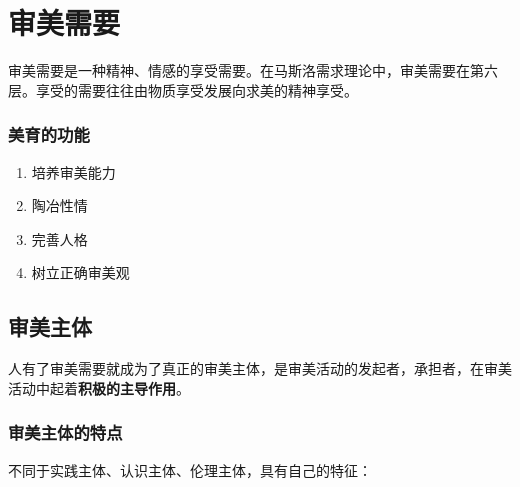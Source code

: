 \documentclass{NoteThesis/note-thesis}
\begin{document}
\maketitle

\tableofcontents

\newpage


\section{审美需要}

审美需要是一种精神、情感的享受需要。在马斯洛需求理论中，审美需要在第六层。享受的需要往往由物质享受发展向求美的精神享受。

\subsubsection*{美育的功能}

\begin{enumerate}
    \item 培养审美能力
    \item 陶冶性情
    \item 完善人格
    \item 树立正确审美观
\end{enumerate}

\subsection{审美主体}

人有了审美需要就成为了真正的审美主体，是审美活动的发起者，承担者，在审美活动中起着\textbf{积极的主导作用}。

\subsubsection{\texorpdfstring{\mbox{}}{} 审美主体的特点}

不同于实践主体、认识主体、伦理主体，具有自己的特征：
\end{document}
